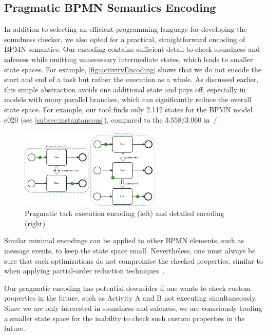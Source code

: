 \documentclass[runningheads]{llncs}
\begin{document}
\subsection{Pragmatic BPMN Semantics Encoding}
In addition to selecting an efficient programming language for developing the soundness checker, we also opted for a practical, straightforward encoding of BPMN semantics.
Our encoding contains sufficient detail to check soundness and safeness while omitting unnecessary intermediate states, which leads to smaller state spaces.
For example, \autoref{fig:activityEncoding} shows that we do not encode the start and end of a task but rather the execution as a whole.
As discussed earlier, this simple abstraction avoids one additional state and pays off, especially in models with many parallel branches, which can significantly reduce the overall state space.
For example, our tool finds only 2.112 states for the BPMN model \textsf{e020} (see \autoref{subsec:instantaneous}), compared to the 3.558/3.060  in~\cite{houhouFirstOrderLogicVerification2022}/\cite{krauterFormalizationAnalysisBPMN2023}.

\begin{figure}[ht]
	\centering
	\includegraphics[width=0.6\textwidth]{images/pragmatic-encoding}
	\caption{Pragmatic task execution encoding (left) and detailed encoding (right)}
	\label{fig:activityEncoding}
\end{figure}

Similar minimal encodings can be applied to other BPMN elements, such as message events, to keep the state space small.
Nevertheless, one must always be sure that such optimizations do not compromise the checked properties, similar to when applying partial-order reduction techniques~\cite{valmariStateExplosionProblem1998}.

Our pragmatic encoding has potential downsides if one wants to check custom properties in the future, such as Activity A and B not executing simultaneously.
Since we are only interested in soundness and safeness, we are consciously trading a smaller state space for the inability to check such custom properties in the future.
\end{document}
